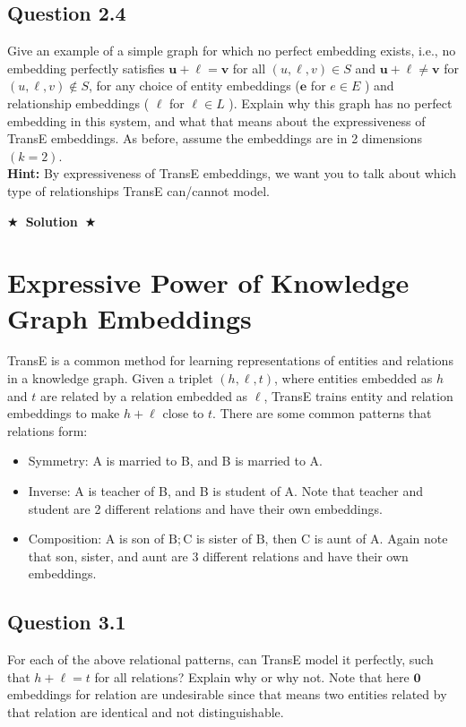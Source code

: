 \documentclass{article}
\newcommand{\Solution}[1]{{\medskip \color{black} \bf $\bigstar$~\sf \textbf{Solution}~$\bigstar$ \sf #1 } \bigskip}
\begin{document}
\subsection*{Question 2.4}
Give an example of a simple graph for which no perfect embedding exists, i.e., no embedding perfectly satisfies $\mathbf{u}+\boldsymbol{\ell}=\mathbf{v}$ for all $(u, \ell, v) \in S$ and $\mathbf{u}+\boldsymbol{\ell} \neq \mathbf{v}$ for $(u, \ell, v) \notin S$, for any choice of entity embeddings ($\mathbf{e}$ for $e \in E$ ) and relationship embeddings ( $\boldsymbol{\ell}$ for $\ell \in L$ ). Explain why this graph has no perfect embedding in this system, and what that means about the expressiveness of TransE embeddings. As before, assume the embeddings are in 2 dimensions $(k=2)$.\\
\textbf{Hint: }By expressiveness of TransE embeddings, we want you to talk about which type of relationships TransE can/cannot model.

\Solution{}


\section{Expressive Power of Knowledge Graph Embeddings}
TransE is a common method for learning representations of entities and relations in a knowledge graph. Given a triplet $(h, \ell, t)$, where entities embedded as $h$ and $t$ are related by a relation embedded as $\ell$, TransE trains entity and relation embeddings to make $h+\ell$ close to $t$. There are some common patterns that relations form:
\begin{itemize}
    \item Symmetry: A is married to B, and B is married to A.
    \item Inverse: A is teacher of B, and B is student of A. Note that teacher and student are 2 different relations and have their own embeddings.
    \item Composition: $\mathrm{A}$ is son of $\mathrm{B} ; \mathrm{C}$ is sister of $\mathrm{B}$, then $\mathrm{C}$ is aunt of $\mathrm{A}$. Again note that son, sister, and aunt are 3 different relations and have their own embeddings.
\end{itemize}

\subsection*{Question 3.1}
For each of the above relational patterns, can TransE model it perfectly, such that $h+\ell=t$ for all relations? Explain why or why not. Note that here $\mathbf{0}$ embeddings for relation are undesirable since that means two entities related by that relation are identical and not distinguishable.
\end{document}
